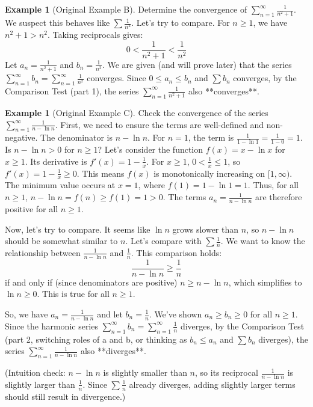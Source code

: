 \documentclass[11pt]{article}
\theoremstyle{plain}
\theoremstyle{definition}
\newtheorem{example}[theorem]{Example}
\theoremstyle{remark}
\theoremstyle{adminstyle}
\begin{document}
\begin{example}[Original Example B] \label{ex:one_over_n2_plus_1}
Determine the convergence of $\sum_{n=1}^{\infty} \frac{1}{n^2 + 1}$.
We suspect this behaves like $\sum \frac{1}{n^2}$. Let's try to compare.
For $n \ge 1$, we have $n^2 + 1 > n^2$. Taking reciprocals gives:
\[ 0 < \frac{1}{n^2 + 1} < \frac{1}{n^2} \]
Let $a_n = \frac{1}{n^2+1}$ and $b_n = \frac{1}{n^2}$. We are given (and will prove later) that the series $\sum_{n=1}^{\infty} b_n = \sum_{n=1}^{\infty} \frac{1}{n^2}$ converges.
Since $0 \le a_n \le b_n$ and $\sum b_n$ converges, by the Comparison Test (part 1), the series $\sum_{n=1}^{\infty} \frac{1}{n^2 + 1}$ also **converges**.
\end{example}

\begin{example}[Original Example C] \label{ex:one_over_n_minus_lnn}
Check the convergence of the series $\sum_{n=1}^{\infty} \frac{1}{n - \ln n}$.
First, we need to ensure the terms are well-defined and non-negative. The denominator is $n - \ln n$.
For $n=1$, the term is $\frac{1}{1 - \ln 1} = \frac{1}{1-0} = 1$.
Is $n - \ln n > 0$ for $n \ge 1$? Let's consider the function $f(x) = x - \ln x$ for $x \ge 1$.
Its derivative is $f'(x) = 1 - \frac{1}{x}$. For $x \ge 1$, $0 < \frac{1}{x} \le 1$, so $f'(x) = 1 - \frac{1}{x} \ge 0$.
This means $f(x)$ is monotonically increasing on $[1, \infty)$.
The minimum value occurs at $x=1$, where $f(1) = 1 - \ln 1 = 1$.
Thus, for all $n \ge 1$, $n - \ln n = f(n) \ge f(1) = 1 > 0$.
The terms $a_n = \frac{1}{n - \ln n}$ are therefore positive for all $n \ge 1$.

Now, let's try to compare. It seems like $\ln n$ grows slower than $n$, so $n - \ln n$ should be somewhat similar to $n$. Let's compare with $\sum \frac{1}{n}$.
We want to know the relationship between $\frac{1}{n - \ln n}$ and $\frac{1}{n}$.
This comparison holds:
\[ \frac{1}{n - \ln n} \ge \frac{1}{n} \]
if and only if (since denominators are positive) $n \ge n - \ln n$, which simplifies to $\ln n \ge 0$. This is true for all $n \ge 1$.

So, we have $a_n = \frac{1}{n - \ln n}$ and let $b_n = \frac{1}{n}$. We've shown $a_n \ge b_n \ge 0$ for all $n \ge 1$.
Since the harmonic series $\sum_{n=1}^{\infty} b_n = \sum_{n=1}^{\infty} \frac{1}{n}$ diverges, by the Comparison Test (part 2, switching roles of a and b, or thinking as $b_n \le a_n$ and $\sum b_n$ diverges), the series $\sum_{n=1}^{\infty} \frac{1}{n - \ln n}$ also **diverges**.

(Intuition check: $n - \ln n$ is slightly smaller than $n$, so its reciprocal $\frac{1}{n - \ln n}$ is slightly larger than $\frac{1}{n}$. Since $\sum \frac{1}{n}$ already diverges, adding slightly larger terms should still result in divergence.)
\end{example}
\end{document}

